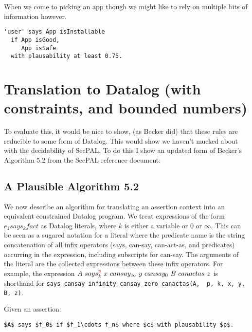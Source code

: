 \documentclass[a4paper]{article}
\newcommand{\new}[1]{{\color{BrickRed} #1}}
\begin{document}
When we come to picking an app though we might like to rely on multiple bits of information however.

\begin{lstlisting}
'user' says App isInstallable
  if App isGood,
     App isSafe
  with plausability at least 0.75.
\end{lstlisting}

\section{Translation to Datalog (with constraints, and bounded numbers)}

To evaluate this, it would be nice to show, (as Becker did) that these rules are reducible to some form of Datalog.
This would show we haven't mucked about with the decidability of SecPAL.
To do this I show an updated form of Becker's Algorithm 5.2 from the SecPAL reference document:

\subsection{A Plausible Algorithm 5.2}

We now describe an algorithm for translating an assertion context into an equivalent
constrained Datalog program. We treat expressions of the form $e_1 says_k fact$ as Datalog
literals, where $k$ is either a variable or 0 or $\infty$. This can be seen as a sugared notation for
a literal where the predicate name is the string concatenation of all infix operators (\textsf{says},
\textsf{can-say}, \textsf{can-act-as}, and predicates) occurring in the expression, including subscripts for
\textsf{can-say}. The arguments of the literal are the collected expressions between these infix
operators. For example, the expression $A~says_k^{\new{p}}~x~can say_\infty~y~can say_0~B~can act as~z$ is
shorthand for \texttt{says\_cansay\_infinity\_cansay\_zero\_canactas(A, \new{p}, k, x, y, B, z)}.

Given an assertion: 
\begin{center} \lstinline!$A$ says $f_0$ if $f_1\cdots f_n$ where $c$ with plausability $p$.! \end{center}
\end{document}
